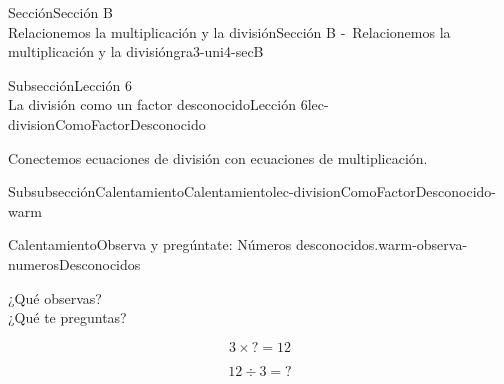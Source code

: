 \begin{sectionptx}{Sección}{{\Large Sección B\\}Relacionemos la multiplicación y la división}{}{Sección B -~Relacionemos la multiplicación y la división}{}{}{gra3-uni4-secB}
%
%
\typeout{************************************************}
\typeout{************************************************}
%
\begin{subsectionptx}{Subsección}{{\normalsize Lección 6\\[-0.05cm]}La división como un factor desconocido}{}{Lección 6}{}{}{lec-divisionComoFactorDesconocido}
\begin{introduction}{}%
Conectemos ecuaciones de división con ecuaciones de multiplicación.%
\end{introduction}%
%
%
\typeout{************************************************}
\typeout{************************************************}
%
\vspace{-0.1cm}
\begin{subsubsectionptx}{Subsubsección}{Calentamiento}{}{Calentamiento}{}{}{lec-divisionComoFactorDesconocido-warm}
\begin{exploration}{Calentamiento}{Observa y pregúntate: Números desconocidos.}{warm-observa-numerosDesconocidos}%
\begin{multicols}{2}
¿Qué observas?\\
 ¿Qué te preguntas?%
\vfill\columnbreak
\begin{sidebyside}{2}{0}{0}{0}%
\begin{sbspanel}{0.5}%
%
\begin{equation*}
3\times {?} =12
\end{equation*}
%
\end{sbspanel}%
\begin{sbspanel}{0.5}%
\par
%
\begin{equation*}
12\div 3 ={?}
\end{equation*}
%
\end{sbspanel}%
\end{sidebyside}%
\end{multicols}
\end{exploration}%
\end{subsubsectionptx}
%
%
\typeout{************************************************}
\typeout{************************************************}
%
\vspace{-0.3cm}

\end{subsectionptx}
\end{sectionptx}
